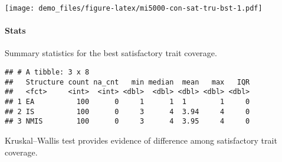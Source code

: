 \documentclass[]{book}
\newenvironment{Shaded}{\begin{snugshade}}{\end{snugshade}}
\newcommand{\CharTok}[1]{\textcolor[rgb]{0.31,0.60,0.02}{#1}}
\newcommand{\CommentTok}[1]{\textcolor[rgb]{0.56,0.35,0.01}{\textit{#1}}}
\newcommand{\DataTypeTok}[1]{\textcolor[rgb]{0.13,0.29,0.53}{#1}}
\newcommand{\KeywordTok}[1]{\textcolor[rgb]{0.13,0.29,0.53}{\textbf{#1}}}
\newcommand{\NormalTok}[1]{#1}
\newcommand{\OperatorTok}[1]{\textcolor[rgb]{0.81,0.36,0.00}{\textbf{#1}}}
\newcommand{\OtherTok}[1]{\textcolor[rgb]{0.56,0.35,0.01}{#1}}
\newcommand{\StringTok}[1]{\textcolor[rgb]{0.31,0.60,0.02}{#1}}
\let\oldparagraph\paragraph
\renewcommand{\paragraph}[1]{\oldparagraph{#1}\mbox{}}
\begin{document}
\texttt{[image: demo\_files/figure-latex/mi5000-con-sat-tru-bst-1.pdf]}

\hypertarget{stats-64}{%
\paragraph{Stats}\label{stats-64}}

Summary statistics for the best satisfactory trait coverage.

\begin{Shaded}
\end{Shaded}

\begin{verbatim}
## # A tibble: 3 x 8
##   Structure count na_cnt   min median  mean   max   IQR
##   <fct>     <int>  <int> <dbl>  <dbl> <dbl> <dbl> <dbl>
## 1 EA          100      0     1      1  1        1     0
## 2 IS          100      0     3      4  3.94     4     0
## 3 NMIS        100      0     3      4  3.95     4     0
\end{verbatim}

Kruskal--Wallis test provides evidence of difference among satisfactory trait coverage.
\end{document}
